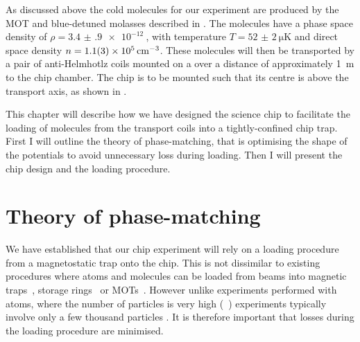 As discussed above  the cold \CaF{} molecules for our experiment
are produced by the MOT and blue-detuned molasses described in
. The molecules have a phase space density of
$\rho=\SI{3.4(9)e-12}{}$, with temperature $T=\SI{52(2)}{\micro\kelvin}$ and
direct space density $n=\SI{1.1(3)E5}{\per\centi\meter\cubed}$. These molecules
will then be transported by a pair of anti-Helmhotlz coils mounted on a
 over a distance of approximately \SI{1}{\meter} to the chip chamber.
The chip is to be mounted such that its centre is 
above the transport axis, as shown in .

This chapter will describe how we have designed the science chip to facilitate
the loading of molecules from the transport coils into a tightly-confined chip
trap. First I will outline the theory of phase-matching, that is optimising the
shape of the potentials to avoid unnecessary loss during loading. Then I will
present the chip design and the loading procedure. 


\section{Theory of phase-matching}

We have established that our chip experiment will rely on a loading procedure
from a magnetostatic trap onto the chip. This is not dissimilar to existing
procedures where atoms and molecules can be loaded from beams into magnetic
traps~\cite{}, storage rings~\cite{} or MOTs~\cite{}. However unlike
experiments performed with atoms, where the number of particles is very high
(~\cite{}) \CaF experiments typically involve only a few thousand
particles \cite{}. It is therefore important that losses during the loading
procedure are minimised.




